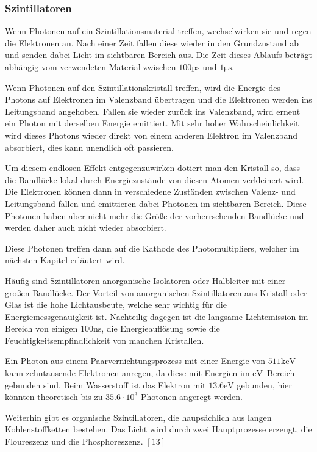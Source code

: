 \documentclass[12pt,a4paper]{scrartcl}
\numberwithin{equation}{section} %
\newcommand{\pu}[1]{\ensuremath{\mathrm{#1}}}
\begin{document}
\hypertarget{szintillatoren}{%
\subsubsection{Szintillatoren}\label{szintillatoren}}
Wenn Photonen auf ein Szintillationsmaterial treffen, wechselwirken sie und regen die Elektronen an. Nach einer Zeit fallen diese wieder in den Grundzustand ab und senden dabei Licht im sichtbaren Bereich aus. Die Zeit dieses Ablaufs beträgt abhängig vom verwendeten Material zwischen $\pu{100 ps}$ und $\pu{1\mu s}$.

Wenn Photonen auf den Szintillationskristall treffen, wird die Energie des Photons auf Elektronen im Valenzband übertragen und die Elektronen werden ins Leitungsband angehoben. Fallen sie wieder zurück ins Valenzband, wird erneut ein Photon mit derselben Energie emittiert. Mit sehr hoher Wahrscheinlichkeit wird dieses Photons wieder direkt von einem anderen Elektron im Valenzband absorbiert, dies kann unendlich oft passieren.

Um diesem endlosen Effekt entgegenzuwirken dotiert man den Kristall so, dass die Bandlücke lokal durch Energiezustände von diesen Atomen verkleinert wird. Die Elektronen können dann in verschiedene Zuständen zwischen Valenz- und Leitungsband fallen und emittieren dabei Photonen im sichtbaren Bereich. Diese Photonen haben aber nicht mehr die Größe der vorherrschenden Bandlücke und werden daher auch nicht wieder absorbiert.

Diese Photonen treffen dann auf die Kathode des Photomultipliers, welcher im nächsten Kapitel erläutert wird.

Häufig sind Szintillatoren anorganische Isolatoren oder Halbleiter mit einer großen Bandlücke. Der Vorteil von anorganischen Szintillatoren aus Kristall oder Glas ist die hohe Lichtausbeute, welche sehr wichtig für die Energiemessgenauigkeit ist. Nachteilig dagegen ist die langsame Lichtemission im Bereich von einigen $\pu{100 ns}$, die Energieauflösung sowie die Feuchtigkeitsempfindlichkeit von manchen Kristallen.

Ein Photon aus einem Paarvernichtungsprozess mit einer Energie von $\pu{511keV}$ kann zehntausende Elektronen anregen, da diese mit Energien im $\pu{eV}$--Bereich gebunden sind. Beim Wasserstoff ist das Elektron mit $\pu{13.6eV}$ gebunden, hier könnten theoretisch bis zu $35.6\cdot 10^3$ Photonen angeregt werden.

Weiterhin gibt es organische Szintillatoren, die haupsächlich aus langen Kohlenstoffketten bestehen. Das Licht wird durch zwei Hauptprozesse erzeugt, die Floureszenz und die Phosphoreszenz. $[13]$
\end{document}
